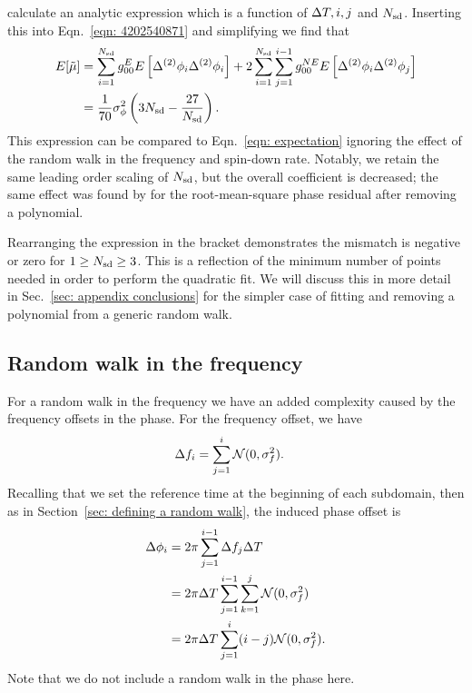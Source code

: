 \documentclass[../full_thesis/full_thesis.tex]{subfiles}
\begin{document}
calculate an analytic expression which is a function of $\Delta T, i, j$ and $N_{\textrm{sd}}$.
Inserting this into Eqn.~\eqref{eqn: 4202540871} and simplifying we find that
\begin{align}
E[\tilde{\mu}]  & = \sum_{i=1}^{N_{\textrm{sd}}}g_{00}^{E} E\left[\Delta^{(2)}\phi_{i}\Delta^{(2)}\phi_{i}\right]
+ 2 \sum_{i=1}^{N_{\textrm{sd}}}\sum_{j=1}^{i-1}g_{00}^{NE}E\left[\Delta^{(2)}\phi_{i}\Delta^{(2)}\phi_{j}\right]  \\
& = \frac{1}{70}\sigma_{\phi}^{2}\left(3N_{\textrm{sd}} - \frac{27}{N_{\textrm{sd}}}\right).
\label{eqn: Expected mismatch RW in phase k2}
\end{align}
This expression can be compared to Eqn.~\eqref{eqn: expectation} ignoring the
effect of the random walk in the frequency and spin-down rate. Notably, we
retain the same leading order scaling of $N_{\textrm{sd}}$, but the overall coefficient is
decreased; the same effect was found by \citet{Cordes1980} for the
root-mean-square phase residual after removing a polynomial.

Rearranging the expression in the bracket demonstrates the mismatch is negative
or zero for $1 \ge N_{\textrm{sd}} \ge 3$. This is a reflection of the minimum number of
points needed in order to perform the quadratic fit. We will discuss this in more
detail in Sec.~\ref{sec: appendix conclusions} for the simpler case of fitting
and removing a polynomial from a generic random walk.

\subsection{Random walk in the frequency}

For a random walk in the frequency we have an added complexity caused by
the frequency offsets in the phase. For the frequency offset, we
have
\begin{align}
\Delta f_{i} &= \sum_{j=1}^{i}\mathcal{N}(0, \sigma_{f}^{2}).
\end{align}
Recalling that we set the reference time at the beginning of each subdomain,
then as in Section~\ref{sec: defining a random walk}, the induced phase offset is
\begin{align}
\Delta\phi_{i} &=2\pi \sum_{j=1}^{i-1}\Delta f_{j}\Delta T \\
 & = 2\pi\Delta T \sum_{j=1}^{i-1}\sum_{k=1}^{j}\mathcal{N}(0, \sigma_{f}^{2}) \\
& = 2\pi\Delta T \sum_{j=1}^{i}(i-j)\mathcal{N}(0, \sigma_{f}^{2}).
\label{eqn: P2F}
\end{align}
Note that we do not include a random walk in the phase here.
\end{document}
